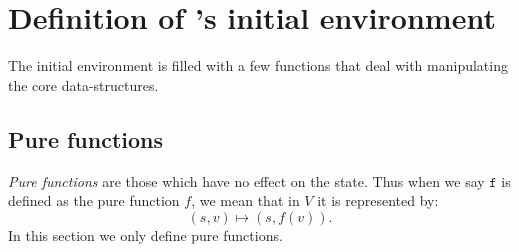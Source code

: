 \section{Definition of \rad's initial environment}
\label{initial-env}

The initial environment is filled with a few functions that deal with
manipulating the core data-structures.

\subsection{Pure functions}

\emph{Pure functions} are those which have no effect on the state. Thus when we
say $\mathtt{f}$ is defined as the pure function $f$, we mean that in $V$ it is
represented by:
\[
  (s, v) \mapsto (s, f(v)).
\]
In this section we only define pure functions.


